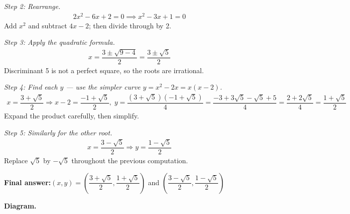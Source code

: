 \documentclass[11pt]{article}
\begin{document}
\textit{Step 2: Rearrange.}
\[\begin{gathered}
2x^2 - 6x + 2 = 0 \implies x^2 - 3x + 1 = 0
\end{gathered}\]
Add \( x^2 \) and subtract \( 4x - 2 \); then divide through by 2.

\textit{Step 3: Apply the quadratic formula.}
\[\begin{gathered}
x = \dfrac{3 \pm \sqrt{9 - 4}}{2} = \dfrac{3 \pm \sqrt{5}}{2}
\end{gathered}\]
Discriminant 5 is not a perfect square, so the roots are irrational.

\textit{Step 4: Find each \( y \) --- use the simpler curve \( y = x^2 - 2x = x(x - 2) \).}
\[\begin{gathered}
x = \dfrac{3 + \sqrt{5}}{2} \Rightarrow x - 2 = \dfrac{-1 + \sqrt{5}}{2}, \; y = \dfrac{(3 + \sqrt{5})(-1 + \sqrt{5})}{4} = \dfrac{-3 + 3\sqrt{5} - \sqrt{5} + 5}{4} = \dfrac{2 + 2\sqrt{5}}{4} = \dfrac{1 + \sqrt{5}}{2}
\end{gathered}\]
Expand the product carefully, then simplify.

\textit{Step 5: Similarly for the other root.}
\[\begin{gathered}
x = \dfrac{3 - \sqrt{5}}{2} \Rightarrow y = \dfrac{1 - \sqrt{5}}{2}
\end{gathered}\]
Replace \( \sqrt{5} \) by \( -\sqrt{5} \) throughout the previous computation.

\begin{answerbox}
\textbf{Final answer:}\quad \(\displaystyle (x, y) = \left(\dfrac{3 + \sqrt{5}}{2}, \dfrac{1 + \sqrt{5}}{2}\right)\) and \(\displaystyle \left(\dfrac{3 - \sqrt{5}}{2}, \dfrac{1 - \sqrt{5}}{2}\right)\)
\end{answerbox}
\textbf{Diagram.}
\end{document}
